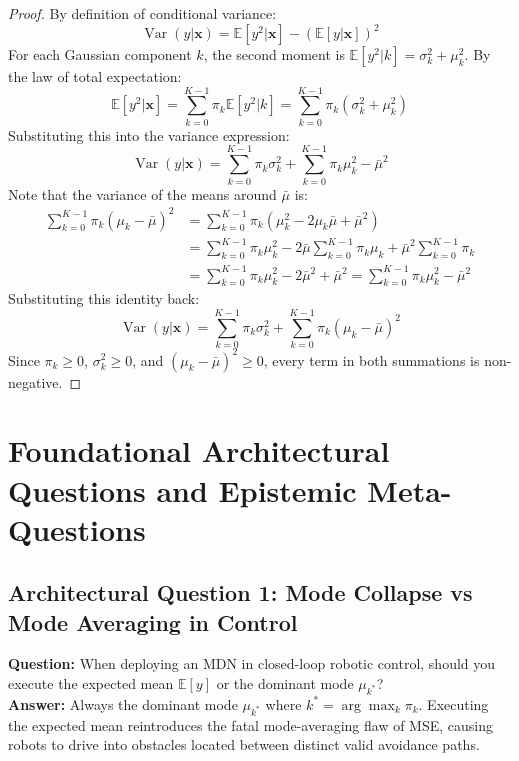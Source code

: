 \documentclass[11pt,a4paper]{article}
\theoremstyle{definition}
\begin{document}
\begin{proof}
By definition of conditional variance:
{\boldmath
\begin{equation}
\operatorname{Var}(y | \mathbf{x}) = \mathbb{E}[y^2 | \mathbf{x}] - (\mathbb{E}[y | \mathbf{x}])^2
\end{equation}
}
For each Gaussian component $k$, the second moment is $\mathbb{E}[y^2 | k] = \sigma_k^2 + \mu_k^2$.
By the law of total expectation:
{\boldmath
\begin{equation}
\mathbb{E}[y^2 | \mathbf{x}] = \sum_{k=0}^{K-1} \pi_k \mathbb{E}[y^2 | k] = \sum_{k=0}^{K-1} \pi_k (\sigma_k^2 + \mu_k^2)
\end{equation}
}
Substituting this into the variance expression:
{\boldmath
\begin{equation}
\operatorname{Var}(y | \mathbf{x}) = \sum_{k=0}^{K-1} \pi_k \sigma_k^2 + \sum_{k=0}^{K-1} \pi_k \mu_k^2 - \bar{\mu}^2
\end{equation}
}
Note that the variance of the means around $\bar{\mu}$ is:
{\boldmath
\begin{align}
\sum_{k=0}^{K-1} \pi_k (\mu_k - \bar{\mu})^2 &= \sum_{k=0}^{K-1} \pi_k (\mu_k^2 - 2\mu_k \bar{\mu} + \bar{\mu}^2) \\
&= \sum_{k=0}^{K-1} \pi_k \mu_k^2 - 2\bar{\mu} \sum_{k=0}^{K-1} \pi_k \mu_k + \bar{\mu}^2 \sum_{k=0}^{K-1} \pi_k \\
&= \sum_{k=0}^{K-1} \pi_k \mu_k^2 - 2\bar{\mu}^2 + \bar{\mu}^2 = \sum_{k=0}^{K-1} \pi_k \mu_k^2 - \bar{\mu}^2
\end{align}
}
Substituting this identity back:
{\boldmath
\begin{equation}
\operatorname{Var}(y | \mathbf{x}) = \sum_{k=0}^{K-1} \pi_k \sigma_k^2 + \sum_{k=0}^{K-1} \pi_k (\mu_k - \bar{\mu})^2
\end{equation}
}
Since $\pi_k \ge 0$, $\sigma_k^2 \ge 0$, and $(\mu_k - \bar{\mu})^2 \ge 0$, every term in both summations is non-negative.
\end{proof}

\section{Foundational Architectural Questions and Epistemic Meta-Questions}

\subsection{Architectural Question 1: Mode Collapse vs Mode Averaging in Control}
\textbf{Question:} When deploying an MDN in closed-loop robotic control, should you execute the expected mean $\mathbb{E}[y]$ or the dominant mode $\mu_{k^*}$?\\
\textbf{Answer:} Always the dominant mode $\mu_{k^*}$ where $k^* = \arg\max_k \pi_k$. Executing the expected mean reintroduces the fatal mode-averaging flaw of MSE, causing robots to drive into obstacles located between distinct valid avoidance paths.
\end{document}
